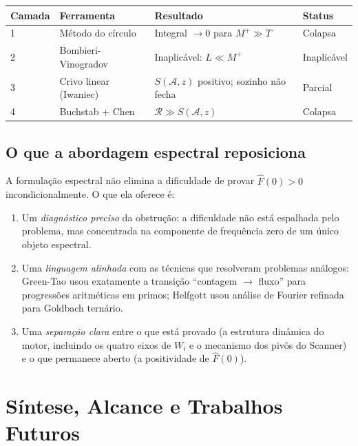 \documentclass[12pt,a4paper]{article}
\theoremstyle{definition}
\begin{document}
	\begin{center}
		\renewcommand{\arraystretch}{1.4}
		\begin{tabular}{llll}
			\toprule
			\textbf{Camada} & \textbf{Ferramenta} & \textbf{Resultado}
			& \textbf{Status} \\
			\midrule
			1 & Método do círculo & Integral $\to 0$ para $M^+ \gg T$
			& Colapsa \\
			2 & Bombieri-Vinogradov & Inaplicável: $L \ll M^+$
			& Inaplicável \\
			3 & Crivo linear (Iwaniec) & $S(\mathcal{A},z)$ positivo;
			sozinho não fecha & Parcial \\
			4 & Buchstab + Chen & $\mathcal{R} \gg S(\mathcal{A},z)$
			& Colapsa \\
			\bottomrule
		\end{tabular}
	\end{center}
	
	\subsection{O que a abordagem espectral reposiciona}
	
	A formulação espectral não elimina a dificuldade de provar
	$\widehat{F}(0) > 0$ incondicionalmente. O que ela oferece é:
	\begin{enumerate}[label=(\alph*)]
		\item Um \emph{diagnóstico preciso} da obstrução: a dificuldade
		não está espalhada pelo problema, mas concentrada na componente
		de frequência zero de um único objeto espectral.
		\item Uma \emph{linguagem alinhada} com as técnicas que
		resolveram problemas análogos: Green-Tao usou exatamente a
		transição ``contagem $\to$ fluxo'' para progressões aritméticas
		em primos; Helfgott \cite{helfgott} usou análise de Fourier
		refinada para Goldbach ternário.
		\item Uma \emph{separação clara} entre o que está provado (a
		estrutura dinâmica do motor, incluindo os quatro eixos de $W_i$
		e o mecanismo dos pivôs do Scanner) e o que permanece aberto
		(a positividade de $\widehat{F}(0)$).
	\end{enumerate}
	
	\section{Síntese, Alcance e Trabalhos Futuros}
	\label{sec:conclusao}
	
\end{document}
